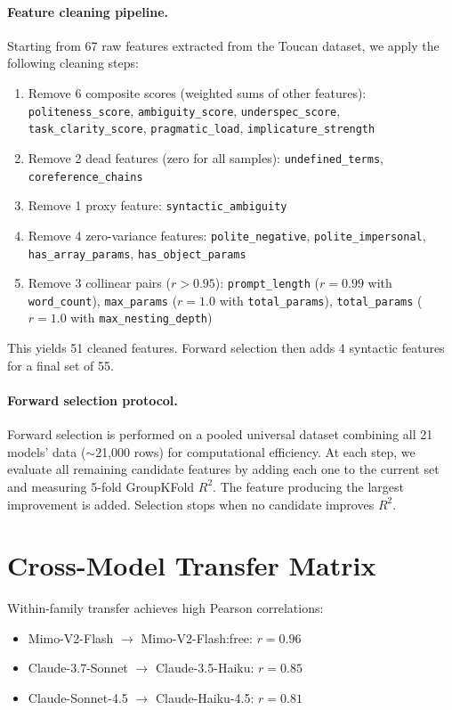 \documentclass{article}
\begin{document}
\paragraph{Feature cleaning pipeline.}
Starting from 67 raw features extracted from the Toucan dataset, we apply the following cleaning steps:
\begin{enumerate}[itemsep=1pt, parsep=0pt]
\item Remove 6 composite scores (weighted sums of other features): \texttt{politeness\_score}, \texttt{ambiguity\_score}, \texttt{underspec\_score}, \texttt{task\_clarity\_score}, \texttt{pragmatic\_load}, \texttt{implicature\_strength}
\item Remove 2 dead features (zero for all samples): \texttt{undefined\_terms}, \texttt{coreference\_chains}
\item Remove 1 proxy feature: \texttt{syntactic\_ambiguity}
\item Remove 4 zero-variance features: \texttt{polite\_negative}, \texttt{polite\_impersonal}, \texttt{has\_array\_params}, \texttt{has\_object\_params}
\item Remove 3 collinear pairs ($r > 0.95$): \texttt{prompt\_length} ($r = 0.99$ with \texttt{word\_count}), \texttt{max\_params} ($r = 1.0$ with \texttt{total\_params}), \texttt{total\_params} ($r = 1.0$ with \texttt{max\_nesting\_depth})
\end{enumerate}

This yields 51 cleaned features. Forward selection then adds 4 syntactic features for a final set of 55.

\paragraph{Forward selection protocol.}
Forward selection is performed on a pooled universal dataset combining all 21 models' data ($\sim$21,000 rows) for computational efficiency. At each step, we evaluate all remaining candidate features by adding each one to the current set and measuring 5-fold GroupKFold $R^2$. The feature producing the largest improvement is added. Selection stops when no candidate improves $R^2$.


\section{Cross-Model Transfer Matrix}
\label{app:transfer}

Within-family transfer achieves high Pearson correlations:
\begin{itemize}[itemsep=1pt, parsep=0pt]
\item Mimo-V2-Flash $\to$ Mimo-V2-Flash:free: $r = 0.96$
\item Claude-3.7-Sonnet $\to$ Claude-3.5-Haiku: $r = 0.85$
\item Claude-Sonnet-4.5 $\to$ Claude-Haiku-4.5: $r = 0.81$
\end{itemize}
\end{document}
